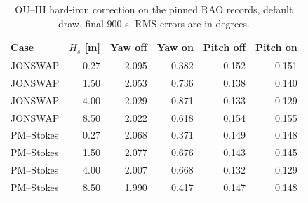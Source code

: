 \begin{table}[t]\centering
\caption{OU--III hard-iron correction on the pinned RAO records, default draw,
final 900 s. RMS errors are in degrees.}
\label{tab:mag-hi-yaw}\footnotesize
\begin{tabular}{@{}lrrrrr@{}}\toprule
Case & $H_s$ [m] & Yaw off & Yaw on & Pitch off & Pitch on \\
\midrule
JONSWAP & 0.27 & 2.095 & 0.382 & 0.152 & 0.151 \\
JONSWAP & 1.50 & 2.053 & 0.736 & 0.138 & 0.140 \\
JONSWAP & 4.00 & 2.029 & 0.871 & 0.133 & 0.129 \\
JONSWAP & 8.50 & 2.022 & 0.618 & 0.154 & 0.155 \\
PM--Stokes & 0.27 & 2.068 & 0.371 & 0.149 & 0.148 \\
PM--Stokes & 1.50 & 2.077 & 0.676 & 0.143 & 0.145 \\
PM--Stokes & 4.00 & 2.007 & 0.668 & 0.132 & 0.129 \\
PM--Stokes & 8.50 & 1.990 & 0.417 & 0.147 & 0.148 \\
\bottomrule\end{tabular}\end{table}
